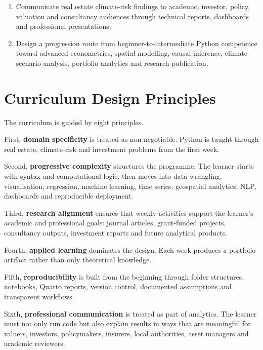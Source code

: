 \documentclass[
  a4paper,
]{article}
\begin{document}
\begin{enumerate}
  Apply reproducible workflow principles, including project folder
  structure, notebook discipline, Quarto reporting, Git/GitHub version
  control, documentation and environment management.
\item
  Communicate real estate climate-risk findings to academic, investor,
  policy, valuation and consultancy audiences through technical reports,
  dashboards and professional presentations.
\item
  Design a progression route from beginner-to-intermediate Python
  competence toward advanced econometrics, spatial modelling, causal
  inference, climate scenario analysis, portfolio analytics and research
  publication.
\end{enumerate}

\section{Curriculum Design
Principles}\label{curriculum-design-principles}

The curriculum is guided by eight principles.

First, \textbf{domain specificity} is treated as non-negotiable. Python
is taught through real estate, climate-risk and investment problems from
the first week.

Second, \textbf{progressive complexity} structures the programme. The
learner starts with syntax and computational logic, then moves into data
wrangling, visualisation, regression, machine learning, time series,
geospatial analytics, NLP, dashboards and reproducible deployment.

Third, \textbf{research alignment} ensures that weekly activities
support the learner's academic and professional goals: journal articles,
grant-funded projects, consultancy outputs, investment reports and
future analytical products.

Fourth, \textbf{applied learning} dominates the design. Each week
produces a portfolio artifact rather than only theoretical knowledge.

Fifth, \textbf{reproducibility} is built from the beginning through
folder structures, notebooks, Quarto reports, version control,
documented assumptions and transparent workflows.

Sixth, \textbf{professional communication} is treated as part of
analytics. The learner must not only run code but also explain results
in ways that are meaningful for valuers, investors, policymakers,
insurers, local authorities, asset managers and academic reviewers.
\end{document}
